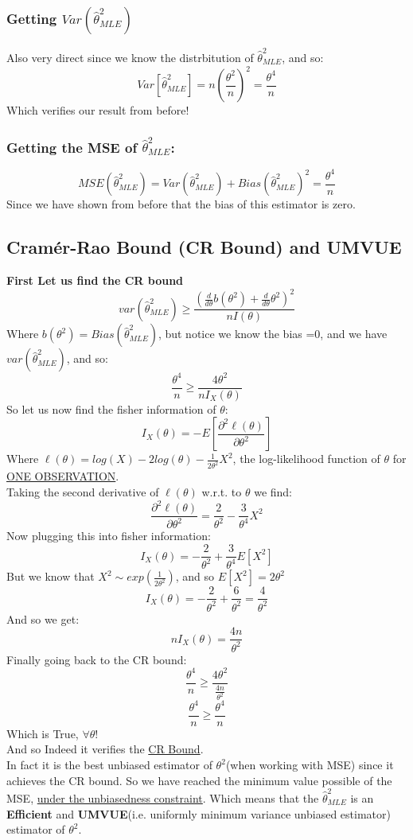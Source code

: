 \documentclass[12pt]{article}
\begin{document}
\subsubsection*{Getting $Var(\hat{\theta}^2_{MLE})$}
Also very direct since we know the distrbitution of $\hat{\theta}^2_{MLE}$, and so:
\[
  Var[\hat{\theta}^2_{MLE}] = n (\frac{\theta^2}{n})^2 = \frac{\theta^4}{n}
\]
Which verifies our result from before!
\subsubsection*{Getting the MSE of $\hat{\theta}^2_{MLE}$: }
\[
  MSE(\hat{\theta}^2_{MLE}) = Var(\hat{\theta}^2_{MLE}) + Bias(\hat{\theta}^2_{MLE})^2 = \frac{\theta^4}{n}
\]
Since we have shown from before that the bias of this estimator is zero.\\

\subsection*{Cramér-Rao Bound (CR Bound) and UMVUE}
\textbf{First Let us find the CR bound }
\[
  var(\hat{\theta}^2_{MLE}) \geq \frac{\left( \frac{d}{d\theta} b(\theta^2) + \frac{d}{d\theta} \theta^2 \right)^2}{n I(\theta)}
\]
Where $b(\theta^2)  = Bias(\hat{\theta}^2_{MLE})$, but notice we know the bias =0, and we have $var(\hat{\theta}^2_{MLE})$, and so:
\[
  \frac{\theta^4}{n} \geq \frac{4\theta^2}{nI_X(\theta)}
\]
So let us now find the fisher information of $\theta$:
\[
  I_X(\theta) = -E[\frac{\partial^2 \ell(\theta)}{\partial \theta^2} ]
\]
Where $\ell(\theta) = log(X) -2log(\theta) -\frac{1}{2\theta^2}X^2$, the log-likelihood function of $\theta$ for \underline{ONE OBSERVATION}. \\
Taking the second derivative of $\ell(\theta)$ w.r.t. to $\theta$ we find:
\[
  \frac{\partial^2 \ell(\theta)}{\partial \theta^2} = \frac{2}{\theta^2} -\frac{3}{\theta^4}X^2
\]
Now plugging this into fisher information:
\[
  I_X(\theta) = -\frac{2}{\theta^2} + \frac{3}{\theta^4}E[X^2]
\]
But we know that $X^2 \sim exp(\frac{1}{2\theta^2})$, and so $E[X^2]= 2\theta^2$
\[
  I_X(\theta) = -\frac{2}{\theta^2} + \frac{6}{\theta^2} = \frac{4}{\theta^2}
\]
And so we get:
\[
  nI_X(\theta) = \frac{4n}{\theta^2}
\]
Finally going back to the CR bound:
\[
  \frac{\theta^4}{n} \geq \frac{4\theta^2}{\frac{4n}{\theta^2}}
\]
\[
  \frac{\theta^4}{n} \geq \frac{\theta^4}{n}
\]
Which is True, $\forall \theta$! \\
And so Indeed it verifies the \underline{CR Bound}. \\
In fact it is the best unbiased estimator of $\theta^2$(when working with MSE) since it achieves the CR bound. So we have reached the minimum value possible of the MSE, \underline{under the unbiasedness constraint}. Which means that the $\hat{\theta}^2_{MLE}$ is an \textbf{Efficient} and \textbf{UMVUE}(i.e. uniformly minimum variance unbiased estimator) estimator of $\theta^2$.
\end{document}
